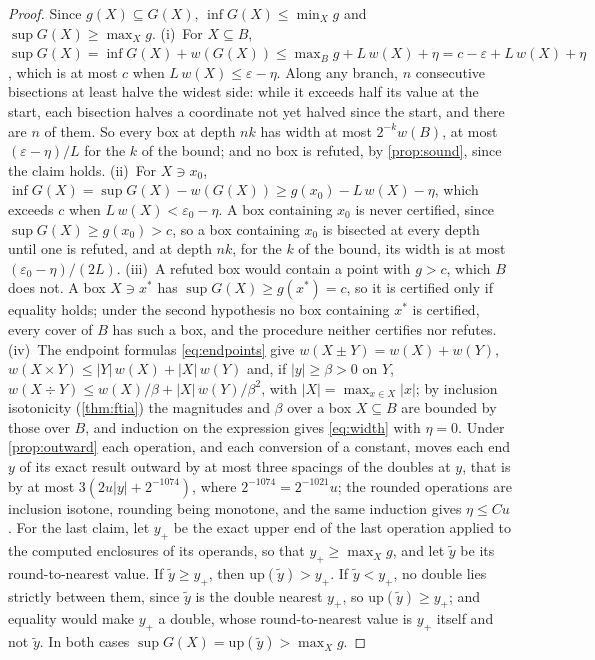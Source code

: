 \documentclass[preprint,11pt,a4paper]{elsarticle}
\theoremstyle{definition}
\begin{document}
\begin{proof}
Since $g(X)\subseteq G(X)$, $\inf G(X)\le\min_X g$ and $\sup G(X)\ge\max_X g$. (i)~For $X\subseteq B$, $\sup G(X)=\inf G(X)+w(G(X))\le\max_B g+L\,w(X)+\eta=c-\varepsilon+L\,w(X)+\eta$, which is at most $c$ when $L\,w(X)\le\varepsilon-\eta$. Along any branch, $n$ consecutive bisections at least halve the widest side: while it exceeds half its value at the start, each bisection halves a coordinate not yet halved since the start, and there are $n$ of them. So every box at depth $nk$ has width at most $2^{-k}w(B)$, at most $(\varepsilon-\eta)/L$ for the $k$ of the bound; and no box is refuted, by \cref{prop:sound}, since the claim holds. (ii)~For $X\ni x_0$, $\inf G(X)=\sup G(X)-w(G(X))\ge g(x_0)-L\,w(X)-\eta$, which exceeds $c$ when $L\,w(X)<\varepsilon_0-\eta$. A box containing $x_0$ is never certified, since $\sup G(X)\ge g(x_0)>c$, so a box containing $x_0$ is bisected at every depth until one is refuted, and at depth $nk$, for the $k$ of the bound, its width is at most $(\varepsilon_0-\eta)/(2L)$. (iii)~A refuted box would contain a point with $g>c$, which $B$ does not. A box $X\ni x^*$ has $\sup G(X)\ge g(x^*)=c$, so it is certified only if equality holds; under the second hypothesis no box containing $x^*$ is certified, every cover of $B$ has such a box, and the procedure neither certifies nor refutes. (iv)~The endpoint formulas \cref{eq:endpoints} give $w(X\pm Y)=w(X)+w(Y)$, $w(X\times Y)\le|Y|\,w(X)+|X|\,w(Y)$ and, if $|y|\ge\beta>0$ on $Y$, $w(X\div Y)\le w(X)/\beta+|X|\,w(Y)/\beta^2$, with $|X|=\max_{x\in X}|x|$; by inclusion isotonicity (\cref{thm:ftia}) the magnitudes and $\beta$ over a box $X\subseteq B$ are bounded by those over $B$, and induction on the expression gives \cref{eq:width} with $\eta=0$. Under \cref{prop:outward} each operation, and each conversion of a constant, moves each end $y$ of its exact result outward by at most three spacings of the doubles at $y$, that is by at most $3(2u|y|+2^{-1074})$, where $2^{-1074}=2^{-1021}u$; the rounded operations are inclusion isotone, rounding being monotone, and the same induction gives $\eta\le Cu$. For the last claim, let $y_+$ be the exact upper end of the last operation applied to the computed enclosures of its operands, so that $y_+\ge\max_X g$, and let $\tilde y$ be its round-to-nearest value. If $\tilde y\ge y_+$, then $\mathrm{up}(\tilde y)>y_+$. If $\tilde y<y_+$, no double lies strictly between them, since $\tilde y$ is the double nearest $y_+$, so $\mathrm{up}(\tilde y)\ge y_+$; and equality would make $y_+$ a double, whose round-to-nearest value is $y_+$ itself and not $\tilde y$. In both cases $\sup G(X)=\mathrm{up}(\tilde y)>\max_X g$.
\end{proof}
\end{document}
